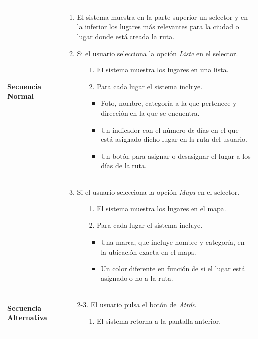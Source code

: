 \begin{longtable}{| p{4cm} | p{10cm} |}
\hline
\textbf{Secuencia Normal} &\mbox{}\par\vspace{-\baselineskip}
\begin{enumerate}[leftmargin=0.7cm, topsep=0.1cm]
\item El sistema muestra en la parte superior un selector y en la inferior los lugares más relevantes para la ciudad o lugar donde está creada la ruta.
\item Si el usuario selecciona la opción \textit{Lista} en el selector.
	\begin{itemize}
	\item[1.] El sistema muestra los lugares en una lista.
	\item[2.] Para cada lugar el sistema incluye.
		\begin{itemize}
		\item Foto, nombre, categoría a la que pertenece y dirección en la que se encuentra.
		\item Un indicador con el número de días en el que está asignado dicho lugar en la ruta del usuario.
		\item Un botón para asignar o desasignar el lugar a los días de la ruta.
		\end{itemize}
	\end{itemize}
\end{enumerate}
\\ &\mbox{}\par\vspace{-\baselineskip}	
\begin{enumerate}[leftmargin=0.7cm, topsep=0.1cm]
\setcounter{enumi}{2}
\item Si el usuario selecciona la opción \textit{Mapa} en el selector.
	\begin{itemize}
	\item[1.] El sistema muestra los lugares en el mapa.
	\item[2.] Para cada lugar el sistema incluye.
		\begin{itemize}
		\item Una marca, que incluye nombre y categoría, en la ubicación exacta en el mapa.
		\item Un color diferente en función de si el lugar está asignado o no a la ruta.
		\end{itemize}
	\end{itemize}
\end{enumerate}


\\
\hline
\textbf{Secuencia Alternativa} &\mbox{}\par\vspace{-\baselineskip}
\begin{enumerate}[leftmargin=0.9cm, topsep=0.1cm]
\item[2-3.] El usuario pulsa el botón de \textit{Atrás}.
	\begin{itemize}
	\item[1.] El sistema retorna a la pantalla anterior.
	\end{itemize}
\end{enumerate}
\\


\end{longtable}
